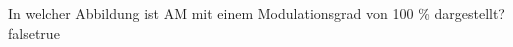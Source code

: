     {In welcher Abbildung ist AM mit einem Modulationsgrad von 100 \% dargestellt?}
    {}
    {}
    {}
    {}
    {false}{true}